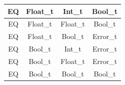 \begin{figure}[H]
\begin{tabular}{cccc}
        \midrule EQ & Float\_t & Int\_t    & Bool\_t \\
        \midrule EQ & Float\_t & Float\_t  & Bool\_t \\
        \midrule EQ & Float\_t & Bool\_t   & Error\_t \\

        \midrule EQ & Bool\_t & Int\_t     & Error\_t \\
        \midrule EQ & Bool\_t & Float\_t   & Error\_t \\
        \midrule EQ & Bool\_t & Bool\_t    & Bool\_t \\

        \bottomrule
    \end{tabular}\\
\end{figure}

\newpage

